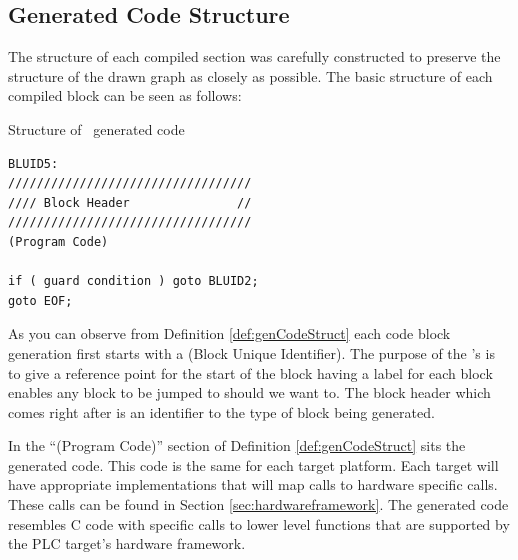 \subsection{Generated Code Structure}
\label{sec:implementation:struct}
The structure of each compiled section was carefully constructed to preserve the 
structure of the drawn graph as closely as possible. The basic structure of 
each compiled block can be seen as follows:

\begin{definition}
\label{def:genCodeStruct}
Structure of \plcchart \  generated code

\begin{lstlisting}[frame=single]
BLUID5:
//////////////////////////////////
//// Block Header               //
//////////////////////////////////
(Program Code)

if ( guard condition ) goto BLUID2;
goto EOF;
\end{lstlisting}
\end{definition}

As you can observe from Definition \ref{def:genCodeStruct} each code block
generation first starts with a  (Block Unique Identifier).
The purpose of the 's is to give a reference point for the
start of the block having a  label for each block enables
any block to be jumped to should we want to. The block header which comes 
right after is an identifier to the type of block being generated. 

In the ``(Program Code)'' section of Definition \ref{def:genCodeStruct} 
sits the generated  code. This code is the same for each target platform. Each  target will have appropriate implementations that will map  calls to hardware specific calls. These calls can be found in Section \ref{sec:hardwareframework}. The generated  code resembles C code with specific calls to lower level functions that are supported by the PLC target's hardware framework.

